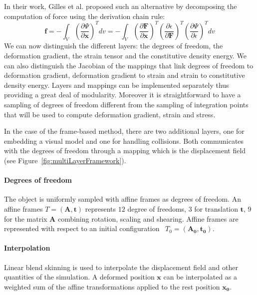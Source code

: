 In their work, Gilles et al. \cite{Gilles2011} proposed such an alternative by decomposing the computation of force using the derivation chain rule:
\begin{equation}
\label{eq:forceChainRule}
\displaystyle \mathbf{f} = -\int_{V} \left(\frac{\partial \Psi}{\partial \mathbf{x}}\right)^{T} dv
=
-\int_{V} \left(\frac{\partial \mathbf{F}}{\partial \mathbf{x}}\right)^{T}
\left(\frac{\partial \epsilon}{\partial \mathbf{F}}\right)^{T}
\left(\frac{\partial \Psi}{\partial \epsilon}\right)^{T} dv
\end{equation}
We can now distinguish the different layers: the degrees of freedom, the deformation gradient, the strain tensor and the constitutive density energy. We can also distinguish the Jacobian of the mappings that link degrees of freedom to deformation gradient, deformation gradient to strain and strain to constitutive density energy. Layers and mappings can be implemented separately thus providing a great deal of modularity. Moreover it is straightforward to have a sampling of degrees of freedom different from the sampling of integration points that will be used to compute deformation gradient, strain and stress.

In the case of the frame-based method, there are two additional layers, one for embedding a visual model and one for handling collisions. Both communicates with the degrees of freedom through a mapping which is the displacement field (see Figure~\ref{fig:multiLayerFramework}).

\paragraph{Degrees of freedom}
The object is uniformly sampled with affine frames as degrees of freedom. An affine frames $T=(\mathbf{A},\mathbf{t})$ represents $12$ degree of freedoms, $3$ for translation $\mathbf{t}$, $9$ for the matrix $\mathbf{A}$ combining rotation, scaling and shearing. Affine frames are represented with respect to an initial configuration ~$T_{0} = \left(\mathbf{A_{0}}, \mathbf{t_{0}}\right)$.

\paragraph{Interpolation}
Linear blend skinning is used to interpolate the displacement field and other quantities of the simulation. A deformed position $\mathbf{x}$ can be interpolated as a weighted sum of the affine transformations applied to the rest position $\mathbf{x_{0}}$.

